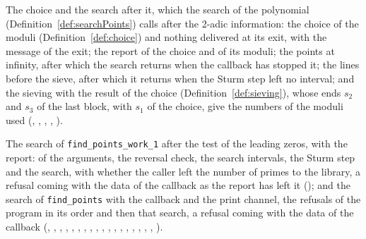 \begin{definition}\label{def:chooseAndSearch}
  \leanok
  The choice and the search after it, which the search of the polynomial
  (Definition~\ref{def:searchPoints}) calls after the 2-adic information: the choice of the moduli
  (Definition~\ref{def:choice}) and nothing delivered at its exit, with the message of the exit; the
  report of the choice and of its moduli; the points at infinity, after which the search returns
  when the callback has stopped it; the lines before the sieve, after which it returns when the
  Sturm step left no interval; and the sieving with the result of the choice
  (Definition~\ref{def:sieving}), whose ends $s_2$ and $s_3$ of the last block, with $s_1$ of the
  choice, give the numbers of the moduli used (,
  , ,
  , ).
\end{definition}

\begin{definition}\label{def:findPointsVerbose}
  \leanok
  The search of \verb|find_points_work_1| after the test of the leading zeros, with the report: of
  the arguments, the reversal check, the search intervals, the Sturm step and the search, with
  whether the caller left the number of primes to the library, a refusal coming with the data of the
  callback as the report has left it (); and the search of
  \verb|find_points| with the callback and the print channel, the refusals of the program in its
  order and then that search, a refusal coming with the data of the callback
  (, ,
  , ,
  , ,
  , ,
  , ,
  , ,
  , ,
  , , ,
  , ).
\end{definition}

